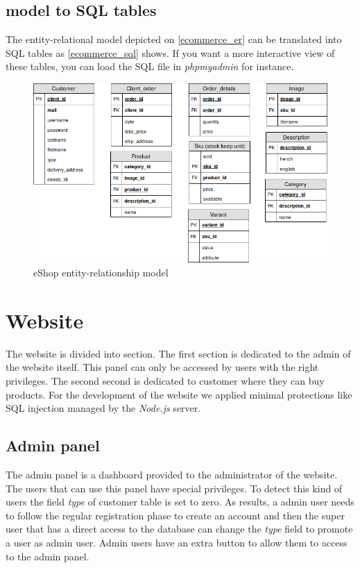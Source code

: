 \documentclass{article}
\begin{document}
\subsection{model to SQL tables}
The entity-relational model depicted on \autoref{ecommerce_er} can be translated into SQL tables as \autoref{ecommerce_sql} shows. If you want a more interactive view of these tables, you can load the SQL file in \textit{phpmyadmin} for instance.

\begin{figure}[h!]
    \centering
    \includegraphics[scale=0.4]{./images/ecommerce_SQL.png}
    \caption{eShop entity-relationship model}
    \label{ecommerce_sql}
\end{figure}

\section{Website}
The website is divided into section. The first section is dedicated to the admin of the website itself. This panel can only be accessed by users with the right privileges. The second second is dedicated to customer where they can buy products. For the development of the website we applied minimal protections like SQL injection managed by the \textit{Node.js} server.

\subsection{Admin panel}
The admin panel is a dashboard provided to the administrator of the website. The users that can use this panel have special privileges. To detect this kind of users the field \textit{type} of customer table is set to zero. As results, a admin user needs to follow the regular registration phase to create an account and then the super user that has a direct access to the database can change the \textit{type} field to promote a user as admin user. Admin users have an extra button to allow them to access to the admin panel.\\
\end{document}
